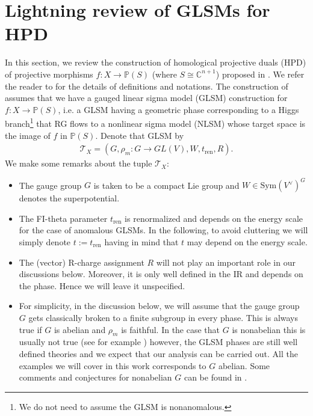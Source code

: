 \documentclass[a4paper,11pt]{article}
\numberwithin{equation}{section}
\begin{document}
   




\section{\label{sec:section2}Lightning review of GLSMs for HPD}

In this section, we review the construction of homological projective duals 
(HPD) of projective morphisms $f:X\rightarrow \mathbb{P}(S)$ (where $S\cong 
\mathbb{C}^{n+1}$) proposed in \cite{Chen:2020iyo}. We refer the reader to 
\cite{Chen:2020iyo} for the details of definitions and notations. The 
construction of \cite{Chen:2020iyo} assumes that we have a gauged linear sigma 
model (GLSM) construction for $f:X\rightarrow \mathbb{P}(S)$, i.e. a GLSM having 
a geometric phase corresponding to a Higgs branch\footnote{We do not need to 
assume the GLSM is nonanomalous.} that RG flows to a nonlinear sigma model 
(NLSM) whose target space is the image of $f$ in $\mathbb{P}(S)$. Denote that 
GLSM by
\begin{eqnarray}
\mathcal{T}_{X}=(G,\rho_{m}: G\rightarrow GL(V),W,t_{\mathrm{ren}},R).
\end{eqnarray}
We make some remarks about the tuple $\mathcal{T}_{X}$:
\begin{itemize}
\item The gauge group $G$ is taken to be a compact Lie group and 
$W\in\mathrm{Sym}(V^{\vee})^{G}$ denotes the superpotential.

 \item The FI-theta parameter $t_{\mathrm{ren}}$ is renormalized and depends on 
the energy scale for the case of anomalous GLSMs. In the following, to avoid 
cluttering we will simply denote $t:=t_{\mathrm{ren}}$ having in mind that $t$ 
may depend on the energy scale.
\item The (vector) R-charge assignment $R$ will not play an important role in 
our discussions below. Moreover, it is only well defined in the IR and depends 
on 
the phase. Hence we will leave it unspecified.  
\item For simplicity, in the discussion below, we will assume that the gauge 
group $G$ gets classically broken to a finite subgroup in every phase. This is 
always true if $G$ is abelian and $\rho_{m}$ is faithful. In the case that $G$ 
is nonabelian this is usually not true (see for example \cite{Hori:2006dk}) 
however, the GLSM phases are still well defined theories and we expect that our 
analysis can be carried out. All the examples we will cover in this work 
corresponds to $G$ abelian. Some comments and conjectures for nonabelian $G$ 
can be found in \cite{Chen:2020iyo}.
\end{itemize}
\end{document}
